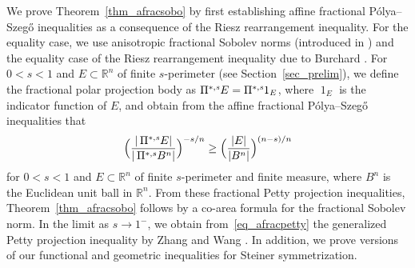 \documentclass{amsart}
\newcommand{\ofpp}[1]{\operatorname{\Pi^{\ast,{\it #1}}}\!}
\newcommand{\Bvtex}{{B^n}}
\newcommand{\vol}[1]{ \vert #1\vert}
\renewcommand{\chi}{\operatorname{1}}
\begin{document}
We prove Theorem~\ref{thm_afracsobo} by first establishing affine fractional
P\'olya--Szeg\H o inequalities as a consequence of the Riesz rearrangement
inequality. For the equality case, we use anisotropic fractional Sobolev
norms (introduced in \cite{Ludwig:fracperi}) and the equality case of the
Riesz rearrangement inequality due to Burchard \cite{Burchard96}. For
$0<s<1$ and $E\subset \mathbb R^{n}$ of finite $s$-perimeter (see Section~\ref{sec_prelim}), we define the fractional polar projection body as
$\ofpp sE = \ofpp s\chi _{E}$, where $\chi _{E}$ is the indicator function
of $E$, and obtain from the affine fractional P\'olya--Szeg\H o inequalities
that
%
\begin{equation}
\label{eq_afracpetty}
\Big(\frac{\vol{\ofpp sE}}{\vol{\ofpp s\Bvtex}}\Big)^{-s/n} \geq \Big(
\frac{\vol{E}}{\vol{\Bvtex}}\Big)^{(n-s)/n}
\end{equation}
%
for $0<s<1$ and $E\subset \mathbb R^{n}$ of finite $s$-perimeter and finite
measure, where $\Bvtex $ is the Euclidean unit ball in $\mathbb R^{n}$. From
these fractional Petty projection inequalities, Theorem~\ref{thm_afracsobo} follows by a co-area formula for the fractional Sobolev
norm. In the limit as $s\to 1^{-}$, we obtain from~\eqref{eq_afracpetty} the generalized Petty projection inequality by Zhang
\cite{Zhang99} and Wang \cite{Tuo_Wang}. In addition, we prove versions
of our functional and geometric inequalities for Steiner symmetrization.
\end{document}
